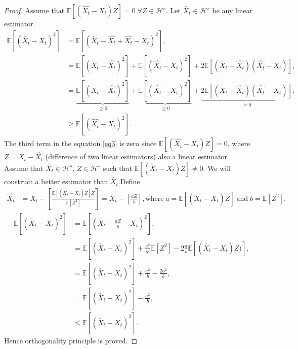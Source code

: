 \documentclass[a4paper,english,12pt]{article}
\begin{document}
\begin{proof}
Assume that $\mathbb{E}[(\hat{X_t}-X_t)Z]=0 \; \forall Z \in \mathcal{H}^s$.
Let $\tilde{X_t}\in \mathcal{H}^s$ be any linear estimator.
\begin{align}
\mathbb{E}[(\tilde{X_t}-X_t)^2]&=\mathbb{E}[(\tilde{X_t}-\hat{X_t}+\hat{X_t}-X_t)^2],
\nonumber\\
&=\mathbb{E}[(\tilde{X_t}-\hat{X_t})^2]+\mathbb{E}[(\hat{X_t}-X_t)^2]+2\mathbb{E}[(\tilde{X_t}-\hat{X_t})(\hat{X_t}-X_t)],
\nonumber\\
&=\underbrace{\mathbb{E}[(\tilde{X_t}-\hat{X_t})^2]}_{\geqslant0}+\underbrace{\mathbb{E}[(\hat{X_t}-X_t)^2]}_{\geqslant0}+ \underbrace{2\mathbb{E}[(\tilde{X_t}-\hat{X_t})(\hat{X_t}-X_t)]}_{=0} \label{eq3},\\
&\geq \mathbb{E}[(\hat{X_t}-X_t)^2].
\nonumber
\end{align}
The third term in the equation \eqref{eq3} is zero since $\mathbb{E}[(\hat{X_t}-X_t)Z]=0$, where $Z=\tilde{X_t}-\hat{X_t}$ (difference of two linear estimators) also a linear estimator. \\
Assume that $\tilde{X_t}\in \mathcal{H}^s$, $Z \in \mathcal{H}^s$ such that $\mathbb{E}[(\tilde{X_t}-X_t)Z]\neq0$.
We will construct a better estimator than $\tilde{X_t}$.Define\\
\begin{align}
\nonumber
\hat{X_t}&=\tilde{X_t}-\left[\frac{\mathbb{E}[(\tilde{X_t}-X_t)Z]Z}{\mathbb{E}[Z^2]}\right]=\tilde{X_t}-\left[\frac{aZ}{b}\right] ,
\text{where} \;a=\mathbb{E}[(\tilde{X_t}-X_t)Z] \; \text {and} \; b=\mathbb{E}[Z^2].
\end{align}
\begin{align}
\mathbb{E}[(\tilde{X_t}-X_t)^2]&=\mathbb{E}[(\tilde{X_t}-\frac{aZ}{b}-X_t)^2],\nonumber\\
&=\mathbb{E}[(\tilde{X_t}-X_t)^2]+\frac{a^2}{b^2}\mathbb{E}[Z^2]-2\frac{a}{b}\mathbb{E}[(\tilde{X_t}-X_t)Z)],\nonumber\\
&=\mathbb{E}[(\tilde{X_t}-X_t)^2]+\frac{a^2}{b}-\frac{2a^2}{b},\nonumber\\
&=\mathbb{E}[(\tilde{X_t}-X_t)^2]-\frac{a^2}{b}\nonumber,\\
&\leq \mathbb{E}[(\tilde{X_t}-X_t)^2].
\nonumber
\end{align}
Hence orthogonality principle is proved.
\end{proof}
\end{document}
